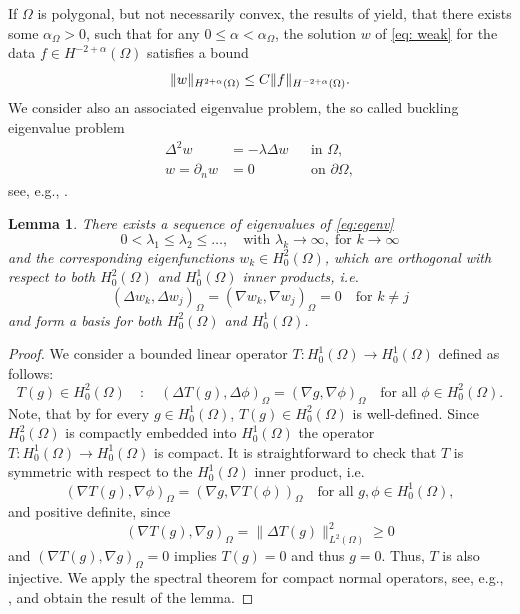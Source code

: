 \documentclass{m2an}
\newcommand{\1}{\mathds{1}}
\newcommand{\Om}{\Omega}
\DeclarePairedDelimiter{\norm}{\lVert}{\rVert}
\newcommand{\Oprod}[1]{\left(#1\right)_{\Omega}}
\newtheorem{lemma}[theorem]{Lemma}
\theoremstyle{definition}
\newcommand{\Cref}[1]{\zcref{#1}}
\begin{document}
If $\Om$ is polygonal, but not necessarily convex, the results of 
  \cite{bacuta_shift_2002,blum_boundary_1980}
     yield, that there exists 
    some $\alpha_\Om > 0$, such that for any $0 \le \alpha < \alpha_\Om$, the solution $w$ of \eqref{eq: weak}
    for the data $f \in H^{-2 + \alpha}(\Om)$ satisfies a bound
    \begin{equation*}
        \|w\|_{H^{2 + \alpha}(\Om)} \le C \norm{f}_{H^{-2+\alpha}(\Om)}.
    \end{equation*}
We consider also an associated eigenvalue problem,  the so called buckling eigenvalue problem
\begin{equation}\label{eq:egenv}
\begin{aligned}
	\Delta^2 w &= -\lambda \Delta w && \text{in } \Omega,\\
	w = \partial_n w &=0 && \text{on } \partial \Omega,
\end{aligned}
\end{equation}
see, e.g., \cite{Wieners:1996,Antunes:2011}.

\begin{lemma}\label{lemma:eigen}
There exists a sequence of eigenvalues of \eqref{eq:egenv}
\[
0 < \lambda_1 \le \lambda_2 \le \dots, \quad \text{with } \lambda_k \to \infty, \;\text{for } k \to \infty
\]
and the corresponding eigenfunctions $w_k \in H^2_0(\Omega)$, which are orthogonal with respect to both $H^2_0(\Omega)$ and $H^1_0(\Omega)$ inner products, i.e.
\[
\Oprod{\Delta w_k,\Delta w_j} = \Oprod{\nabla w_k,\nabla w_j} = 0 \quad \text{for } k \neq j
\]
and form a basis for both $H^2_0(\Omega)$ and $H^1_0(\Omega)$.
\end{lemma}
\begin{proof}
We consider a bounded linear operator $T \colon H^1_0(\Omega) \to H^1_0(\Omega)$ defined as follows:
\begin{equation}\label{opeartor:T}
	T(g)\in H^2_0(\Omega) \quad:\quad \Oprod{\Delta T(g), \Delta \phi} 
  = \Oprod{\nabla g,\nabla \phi} \quad \text{for all } \phi \in H^2_0(\Omega).
\end{equation}
Note, that by \Cref{cor:biharmonic} for every $g \in H^1_0(\Omega)$, $T(g)\in H^2_0(\Omega)$ is well-defined. Since $H^2_0(\Omega)$ is compactly embedded into $H^1_0(\Omega)$ the operator $T \colon H^1_0(\Omega) \to H^1_0(\Omega)$ is compact. It is straightforward to check that $T$ is symmetric with respect to the $H^1_0(\Omega)$ inner product, i.e. 
\[
\Oprod{\nabla T(g), \nabla \phi} = \Oprod{\nabla g, \nabla T(\phi)} 
\quad \text{for all } g,\phi \in H^1_0(\Omega),
\]
and positive definite, since
\[
\Oprod{\nabla T(g), \nabla g} = \|\Delta T(g)\|^2_{L^2(\Omega)} \ge 0
\]
and $\Oprod{\nabla T(g), \nabla g} =0$ implies $T(g)=0$ and thus $g=0$. Thus, $T$ is also injective. We apply the
spectral theorem for compact normal operators, see, e.g., \cite[Theorem 12.12]{Alt:2016}, and obtain the result of the lemma.
\end{proof}
\end{document}
